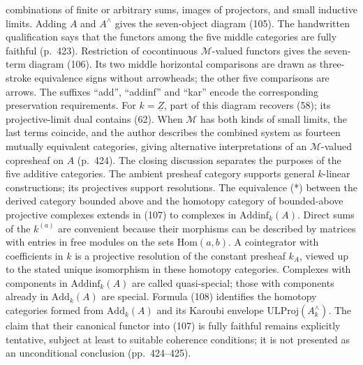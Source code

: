 combinations of finite or arbitrary sums, images of projectors, and small inductive limits. Adding $A$ and $A^\wedge$ gives the seven-object diagram (105). The handwritten qualification says that the functors among the five middle categories are fully faithful (p.\ 423). Restriction of cocontinuous $\mathcal M$-valued functors gives the seven-term diagram (106). Its two middle horizontal comparisons are drawn as three-stroke equivalence signs without arrowheads; the other five comparisons are arrows. The suffixes ``add'', ``addinf'' and ``kar'' encode the corresponding preservation requirements. For $k=\underline Z$, part of this diagram recovers (58); its projective-limit dual contains (62). When $\mathcal M$ has both kinds of small limits, the last terms coincide, and the author describes the combined system as fourteen mutually equivalent categories, giving alternative interpretations of an $\mathcal M$-valued copresheaf on $A$ (p.\ 424). The closing discussion separates the purposes of the five additive categories. The ambient presheaf category supports general $k$-linear constructions; its projectives support resolutions. The equivalence (*) between the derived category bounded above and the homotopy category of bounded-above projective complexes extends in (107) to complexes in $\mathrm{Addinf}_k(A)$. Direct sums of the $k^{(a)}$ are convenient because their morphisms can be described by matrices with entries in free modules on the sets $\mathrm{Hom}(a,b)$. A cointegrator with coefficients in $k$ is a projective resolution of the constant presheaf $k_A$, viewed up to the stated unique isomorphism in these homotopy categories. Complexes with components in $\mathrm{Addinf}_k(A)$ are called quasi-special; those with components already in $\mathrm{Add}_k(A)$ are special. Formula (108) identifies the homotopy categories formed from $\mathrm{Add}_k(A)$ and its Karoubi envelope $\mathrm{ULProj}(A^\wedge_k)$. The claim that their canonical functor into (107) is fully faithful remains explicitly tentative, subject at least to suitable coherence conditions; it is not presented as an unconditional conclusion (pp.\ 424--425).

